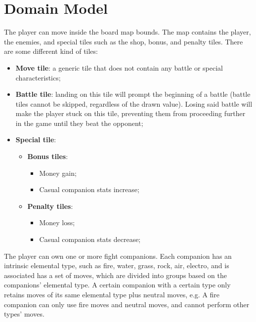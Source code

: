 \documentclass[12pt, a4paper]{report}
\begin{document}
\section{Domain Model}

    The player can move inside the board map bounds. The map contains the player, the enemies, and special tiles such as the shop, bonus, and penalty tiles.
    There are some different kind of tiles:
\begin{itemize}
    \item \textbf{Move tile}: a generic tile that does not contain any battle or special characteristics;
    \item \textbf{Battle tile}: landing on this tile will prompt the beginning of a battle (battle tiles cannot be skipped, regardless of the drawn value).
        Losing said battle will make the player stuck on this tile, preventing them from proceeding further in the game until they beat the opponent;
    \item \textbf{Special tile}:
    \begin{itemize}
        \item \textbf{Bonus tiles}:
        \begin{itemize}
            \item Money gain;
            \item Casual companion stats increase;
        \end{itemize}
    \end{itemize}
    \begin{itemize}
        \item \textbf{Penalty tiles}:
        \begin{itemize}
            \item Money loss;
            \item Casual companion stats decrease;
        \end{itemize}
    \end{itemize}
\end{itemize}

    The player can own one or more fight companions. Each companion has an intrinsic elemental type, such as fire, water, grass, rock, air, electro,
    and is associated has a set of moves, which are divided into groups based on the companions' elemental type. A certain companion with a certain
    type only retains moves of its same elemental type plus neutral moves, e.g. A fire companion can only use fire moves and neutral moves,
    and cannot perform other types' moves.
\end{document}

